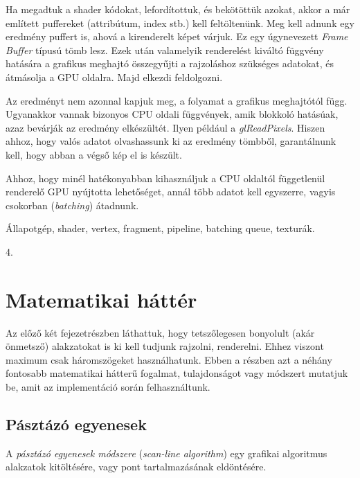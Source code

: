 \documentclass[12pt]{report}
\theoremstyle{definition}
\newcommand{\inenglish}[1]{\textsl{#1}}
\newcommand{\func}[1]{{\textsl{#1}}}
\begin{document}
Ha megadtuk a shader kódokat, lefordítottuk, és bekötöttük azokat, akkor a már
említett puffereket (attribútum, index stb.) kell feltöltenünk. Meg kell adnunk
egy eredmény puffert is, ahová a kirenderelt képet várjuk. Ez egy úgynevezett
\func{Frame Buffer} típusú tömb lesz. Ezek után valamelyik renderelést kiváltó
függvény hatására a grafikus meghajtó összegyűjti a rajzoláshoz szükséges
adatokat, és átmásolja a GPU oldalra. Majd elkezdi feldolgozni.

Az eredményt nem azonnal kapjuk meg, a folyamat a grafikus meghajtótól függ.
Ugyanakkor vannak bizonyos CPU oldali függvények, amik blokkoló hatásúak, azaz
bevárják az eredmény elkészültét. Ilyen például a \func{glReadPixels}. Hiszen
ahhoz, hogy valós adatot olvashassunk ki az eredmény tömbből, garantálnunk kell,
hogy abban a végső kép el is készült.

Ahhoz, hogy minél hatékonyabban kihasználjuk a CPU oldaltól függetlenül
renderelő GPU nyújtotta lehetőséget, annál több adatot kell egyszerre, vagyis
csokorban (\inenglish{batching}) átadnunk.

  \begin{description}[noitemsep]
    \item[Kulcsszavak] Állapotgép, shader, vertex, fragment, pipeline, batching
    queue, texturák.
    \item[Becsült oldalszám] 4.
  \end{description}

    \section[Matematikai háttér]{Matematikai háttér}
    \label{Matematikai háttér}

Az előző két fejezetrészben láthattuk, hogy tetszőlegesen bonyolult (akár
önmetsző) alakzatokat is ki kell tudjunk rajzolni, renderelni. Ehhez viszont
maximum csak háromszögeket használhatunk. Ebben a részben azt a néhány fontosabb
matematikai hátterű fogalmat, tulajdonságot vagy módszert mutatjuk be, amit az
implementáció során felhasználtunk.

    \subsection*{Pásztázó egyenesek}
    \label{Pásztázó egyenesek}

A \emph{pásztázó egyenesek módszere} (\inenglish{scan-line algorithm}) egy
grafikai algoritmus alakzatok kitöltésére, vagy pont tartalmazásának
eldöntésére.
\end{document}

